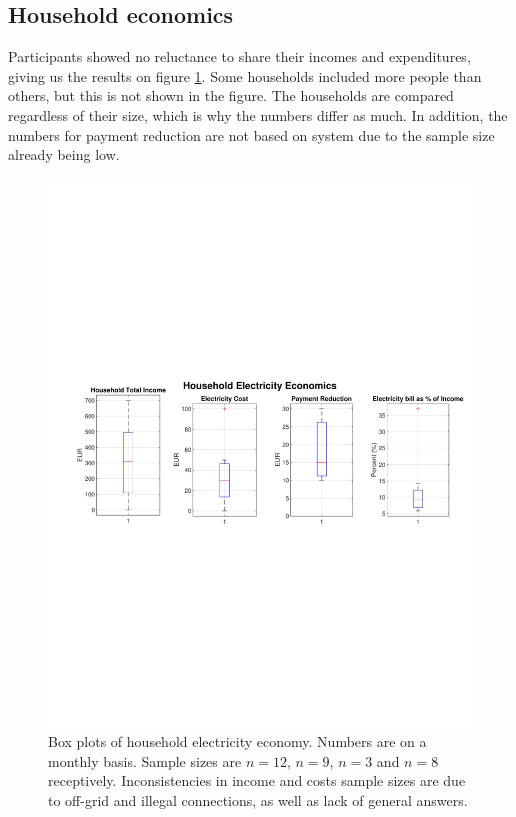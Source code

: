 \subsection{Household economics}
Participants showed no reluctance to share their incomes and expenditures, giving us the results on figure \ref{res:fig:HouseholdElectricityEconomy}. Some households included more people than others, but this is not shown in the figure. The households are compared regardless of their size, which is why the numbers differ as much. In addition, the numbers for payment reduction are not based on system due to the sample size already being low. 
\begin{figure}[H]
    \centering
    \includegraphics[width=\linewidth]{photos/HouseholdElectricityEconomy.pdf}
    \caption{Box plots of household electricity economy. Numbers are on a monthly basis. Sample sizes are $n=12$, $n=9$, $n=3$ and $n=8$ receptively. Inconsistencies in income and costs sample sizes are due to off-grid and illegal connections, as well as lack of general answers.}
    \label{res:fig:HouseholdElectricityEconomy}
\end{figure}
